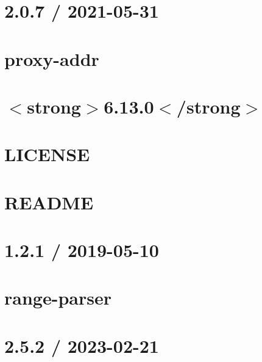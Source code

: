 \documentclass[twoside]{book}
\newcommand{\+}{\discretionary{\mbox{\scriptsize$\hookleftarrow$}}{}{}}
\begin{document}
\chapter{2.0.7 / 2021-\/05-\/31}
\label{md_Backend_nodejs_node_modules_proxy_addr_HISTORY}

\chapter{proxy-\/addr}
\label{md_Backend_nodejs_node_modules_proxy_addr_README}

\chapter{\texorpdfstring{$<$}{<}strong\texorpdfstring{$>$}{>}6.13.0\texorpdfstring{$<$}{<}/strong\texorpdfstring{$>$}{>}}
\label{md_Backend_nodejs_node_modules_qs_CHANGELOG}

\chapter{LICENSE}
\label{md_Backend_nodejs_node_modules_qs_LICENSE}

\chapter{README}
\label{md_Backend_nodejs_node_modules_qs_README}

\chapter{1.2.1 / 2019-\/05-\/10}
\label{md_Backend_nodejs_node_modules_range_parser_HISTORY}

\chapter{range-\/parser}
\label{md_Backend_nodejs_node_modules_range_parser_README}

\chapter{2.5.2 / 2023-\/02-\/21}
\label{md_Backend_nodejs_node_modules_raw_body_HISTORY}

\end{document}
